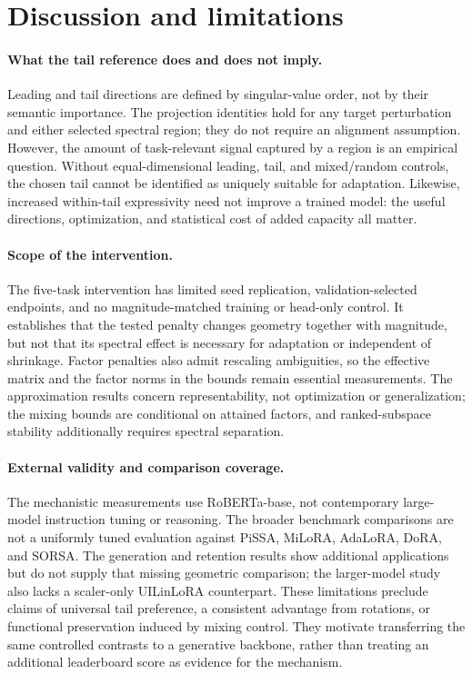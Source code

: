 \section{Discussion and limitations}
\label{sec:discussion}

\paragraph{What the tail reference does and does not imply.}
Leading and tail directions are defined by singular-value order, not by their semantic importance. The projection identities hold for any target perturbation and either selected spectral region; they do not require an alignment assumption. However, the amount of task-relevant signal captured by a region is an empirical question. Without equal-dimensional leading, tail, and mixed/random controls, the chosen tail cannot be identified as uniquely suitable for adaptation. Likewise, increased within-tail expressivity need not improve a trained model: the useful directions, optimization, and statistical cost of added capacity all matter.

\paragraph{Scope of the intervention.}
The five-task intervention has limited seed replication, validation-selected endpoints, and no magnitude-matched training or head-only control. It establishes that the tested penalty changes geometry together with magnitude, but not that its spectral effect is necessary for adaptation or independent of shrinkage. Factor penalties also admit rescaling ambiguities, so the effective matrix and the factor norms in the bounds remain essential measurements. The approximation results concern representability, not optimization or generalization; the mixing bounds are conditional on attained factors, and ranked-subspace stability additionally requires spectral separation.

\paragraph{External validity and comparison coverage.}
The mechanistic measurements use RoBERTa-base, not contemporary large-model instruction tuning or reasoning. The broader benchmark comparisons are not a uniformly tuned evaluation against PiSSA, MiLoRA, AdaLoRA, DoRA, and SORSA. The generation and retention results show additional applications but do not supply that missing geometric comparison; the larger-model study also lacks a scaler-only UILinLoRA counterpart. These limitations preclude claims of universal tail preference, a consistent advantage from rotations, or functional preservation induced by mixing control. They motivate transferring the same controlled contrasts to a generative backbone, rather than treating an additional leaderboard score as evidence for the mechanism.

